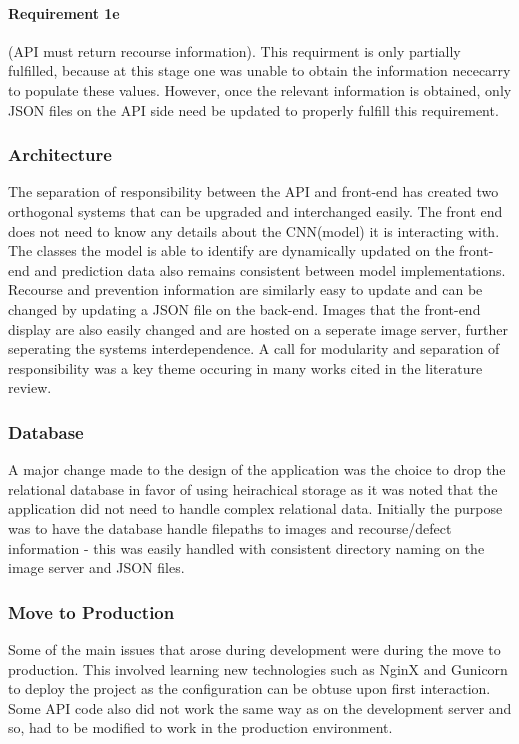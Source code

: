   \paragraph{Requirement 1e}
  (API must return recourse information). This requirment is only partially fulfilled, because at this stage one was unable to obtain the information nececarry to populate these values. However, once the relevant information is obtained, only JSON files on the API side need be updated to properly fulfill this requirement.
\subsubsection{Architecture}
  The separation of responsibility between the API and front-end has created two orthogonal systems that can be upgraded and interchanged easily. The front end does not need to know any details about the CNN(model) it is interacting with. The classes the model is able to identify are dynamically updated on the front-end and prediction data also remains consistent between model implementations. Recourse and prevention information are similarly easy to update and can be changed by updating a JSON file on the back-end. Images that the front-end display are also easily changed and are hosted on a seperate image server, further seperating the systems interdependence. A call for modularity and separation of responsibility was a key theme occuring in many works cited in the literature review.
\subsubsection{Database}
  A major change made to the design of the application was the choice to drop the relational database in favor of using heirachical storage as it was noted that the application did not need to handle complex relational data. Initially the purpose was to have the database handle filepaths to images and recourse/defect information - this was easily handled with consistent directory naming on the image server and JSON files.
\subsubsection{Move to Production}
  Some of the main issues that arose during development were during the move to production. This involved learning new technologies such as NginX and Gunicorn to deploy the project as the configuration can be obtuse upon first interaction. Some API code also did not work the same way as on the development server and so, had to be modified to work in the production environment.
